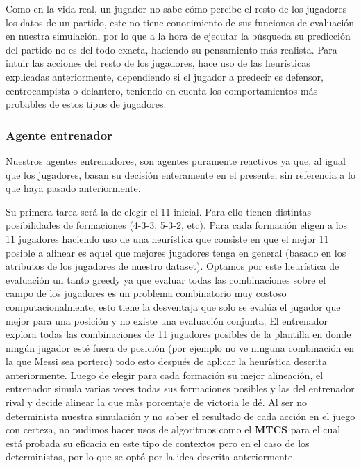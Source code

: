 \documentclass{article}
\begin{document}
Como en la vida real, un jugador no sabe cómo percibe el resto de los jugadores los datos de un partido, este no 
tiene conocimiento de sus funciones de evaluación en nuestra simulación, por lo que a la hora de ejecutar la búsqueda
su predicción del partido no es del todo exacta, haciendo su pensamiento más realista. Para intuir las acciones del 
resto de los jugadores, hace uso de las heurísticas explicadas anteriormente, dependiendo si el jugador a predecir 
es defensor, centrocampista o delantero, teniendo en cuenta los comportamientos más probables de estos tipos de 
jugadores.

\subsubsection{Agente entrenador}
Nuestros agentes entrenadores, son agentes puramente reactivos ya que, al igual que los jugadores, basan 
su decisión enteramente en el presente, sin referencia a lo que haya pasado anteriormente.

Su primera tarea será la de elegir el 11 inicial. Para ello tienen distintas posibilidades de formaciones 
(4-3-3, 5-3-2, etc). Para cada formación eligen a los 11 jugadores haciendo uso de una heurística que consiste en 
que el mejor 11 posible a alinear es aquel que mejores jugadores tenga en general (basado en los atributos de los 
jugadores de nuestro dataset). Optamos por este heurística de evaluación un tanto greedy ya que evaluar todas las 
combinaciones sobre el campo de los jugadores es un problema combinatorio muy costoso computacionalmente, esto tiene la
desventaja que solo se evalúa el jugador que mejor para una posición y no existe una evaluación conjunta. El entrenador 
explora todas las combinaciones de 11 jugadores posibles de la plantilla en donde ningún jugador esté fuera de 
posición (por ejemplo no ve ninguna combinación en la que Messi sea portero) todo esto después de aplicar la 
heurística descrita anteriormente. Luego de elegir para cada formación su mejor alineación, el entrenador simula 
varias veces todas sus formaciones posibles y las del entrenador rival y decide alinear la que màs porcentaje de 
victoria le dé. Al ser no determinista nuestra simulación y no saber el resultado de cada acción en el juego con 
certeza, no pudimos hacer usos de algoritmos como el \textbf{MTCS} para el cual está probada su eficacia en este tipo de 
contextos pero en el caso de los deterministas, por lo que se optó por la idea descrita anteriormente.
\end{document}
